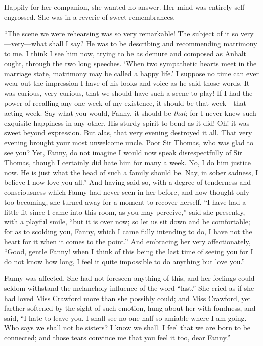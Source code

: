 Happily for her companion, she wanted no answer.
Her mind was entirely self-engrossed. She was in a reverie
of sweet remembrances.

``The scene we were rehearsing was so very remarkable!
The subject of it so very---very---what shall I say?
He was to be describing and recommending matrimony to me.
I think I see him now, trying to be as demure and composed
as Anhalt ought, through the two long speeches.
`When two sympathetic hearts meet in the marriage state,
matrimony may be called a happy life.'  I suppose no time
can ever wear out the impression I have of his looks
and voice as he said those words.  It was curious,
very curious, that we should have such a scene to play!
If I had the power of recalling any one week of my existence,
it should be that week---that acting week.  Say what
you would, Fanny, it should be \emph{that}; for I never knew
such exquisite happiness in any other.  His sturdy spirit
to bend as it did!  Oh! it was sweet beyond expression.
But alas, that very evening destroyed it all.  That very
evening brought your most unwelcome uncle.  Poor Sir Thomas,
who was glad to see you?  Yet, Fanny, do not imagine I would
now speak disrespectfully of Sir Thomas, though I certainly
did hate him for many a week.  No, I do him justice now.
He is just what the head of such a family should be.
Nay, in sober sadness, I believe I now love you all.''
And having said so, with a degree of tenderness and
consciousness which Fanny had never seen in her before,
and now thought only too becoming, she turned away
for a moment to recover herself.  ``I have had a little
fit since I came into this room, as you may perceive,''
said she presently, with a playful smile, ``but it is
over now; so let us sit down and be comfortable; for as to
scolding you, Fanny, which I came fully intending to do,
I have not the heart for it when it comes to the point.''
And embracing her very affectionately, ``Good, gentle Fanny!
when I think of this being the last time of seeing you for I
do not know how long, I feel it quite impossible to do anything
but love you.''

Fanny was affected.  She had not foreseen anything of this,
and her feelings could seldom withstand the melancholy
influence of the word ``last.''  She cried as if she
had loved Miss Crawford more than she possibly could;
and Miss Crawford, yet farther softened by the sight
of such emotion, hung about her with fondness, and said,
``I hate to leave you.  I shall see no one half so amiable
where I am going.  Who says we shall not be sisters?
I know we shall.  I feel that we are born to be connected;
and those tears convince me that you feel it too,
dear Fanny.''

